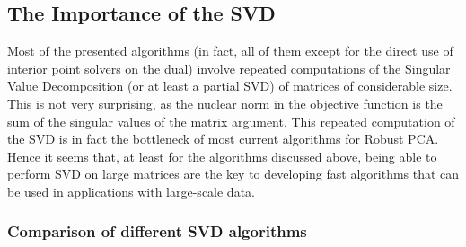 \documentclass{../../common/projectreport}
\begin{document}
\subsection{The Importance of the SVD}
\label{Algorithms:Discussion:SVD:Subsec}


Most of the presented algorithms (in fact, all of them except for the direct use of interior point solvers on the dual) involve repeated computations of the Singular Value Decomposition (or at least a partial SVD) of matrices of considerable size. This is not very surprising, as the nuclear norm in the objective function is the sum of the singular values of the matrix argument. This repeated computation of the SVD is in fact the bottleneck of most current algorithms for Robust PCA. Hence it seems that, at least for the algorithms discussed above, being able to perform SVD on large matrices are the key to developing fast algorithms that can be used in applications with large-scale data. 


\subsubsection{Comparison of different SVD algorithms}
\label{Algorithms:Discussion:SVD:Comparison:Subsubsec}
\end{document}
